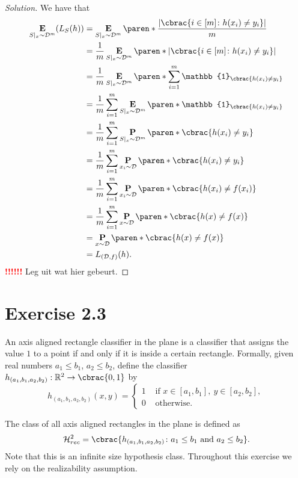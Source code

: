 \documentclass[10pt, a4paper, twoside]{amsart}
\newcommand{\R}{\ensuremath{\mathbb{R}}}
\DeclarePairedDelimiter\abs{\lvert}{\rvert}
\DeclarePairedDelimiter\cbrac\{\}
\DeclarePairedDelimiter\paren()
\renewcommand{\c}{\ensuremath{\colon}}
\newcommand{\Ind}{\ensuremath{\mathbb{1}}}
\renewcommand{\P}{\operatorname*{\ensuremath{\mathbf{P}}}}
\newcommand{\Ev}{\operatorname*{\ensuremath{\mathbf{E}}}}
\newenvironment{solution}
               {\let\oldqedsymbol=\qedsymbol
                \renewcommand{\qedsymbol}{$\blacktriangleleft$}
                \begin{proof}[Solution]}
               {\end{proof}
                \renewcommand{\qedsymbol}{\oldqedsymbol}}
\newcommand{\TODO}{\textcolor{red}{\textbf{!!!!!! }}}
\begin{document}
\begin{solution}
We have that
\begin{align*}
 \Ev\limits_{S|_x \sim \mathcal{D}^m}(L_{S}(h)) 
 &=\Ev\limits_{S|_x \sim \mathcal{D}^m}\paren*{\frac{\abs{\cbrac{i\in [m] \c h(x_i) \neq y_i}}}{m}} \\
 &=\frac{1}{m}\Ev\limits_{S|_x \sim \mathcal{D}^m}\paren*{\abs{\cbrac{i\in [m] \c h(x_i) \neq y_i}}} \\
 &=\frac{1}{m}\Ev\limits_{S|_x \sim \mathcal{D}^m}\paren*{\sum_{i=1}^m \Ind_{\cbrac{h(x_i)\neq y_i}}} \\
 &=\frac{1}{m}\sum_{i=1}^m \Ev\limits_{S|_x \sim \mathcal{D}^m}\paren*{\Ind_{\cbrac{h(x_i)\neq y_i}}} \\
 &=\frac{1}{m}\sum_{i=1}^m \P\limits_{S|_x \sim \mathcal{D}^m}\paren*{\cbrac{h(x_i)\neq y_i}} \\
 &=\frac{1}{m}\sum_{i=1}^m \P\limits_{x_i \sim \mathcal{D}}\paren*{\cbrac{h(x_i)\neq y_i}} \\
 &=\frac{1}{m}\sum_{i=1}^m \P\limits_{x_i \sim \mathcal{D}}\paren*{\cbrac{h(x_i)\neq f(x_i)}} \\
 &=\frac{1}{m}\sum_{i=1}^m \P\limits_{x \sim \mathcal{D}}\paren*{\cbrac{h(x)\neq f(x)}} \\
 &=\P\limits_{x \sim \mathcal{D}}\paren*{\cbrac{h(x)\neq f(x)}} \\
 &=L_{(\mathcal{D},f)}(h).
\end{align*}
\TODO Leg uit wat hier gebeurt.


\end{solution}


\section*{Exercise 2.3}
An axis aligned rectangle classifier in the plane is a classifier that assigns the value $1$ to a point 
if and only if it is inside a certain rectangle. 
Formally, given real numbers $a_1 \leq b_1$, $a_2 \leq b_2$, define the classifier $h_{(a_1, b_1, a_2, b_2)}:\R^2\to\cbrac{0,1}$ by
\begin{equation*}
h_{(a_1, b_1, a_2, b_2)}(x, y)=
\begin{cases}
 1 & \text{ if }x \in [a_1, b_1], \ y \in [a_2, b_2], \\
 0 & \text{ otherwise}.
\end{cases}
\end{equation*}

The class of all axis aligned rectangles in the plane is defined as
\begin{equation*}
\mathcal{H}^2_{rec}=\cbrac{h_{(a_1, b_1, a_2, b_2)} \c a_1 \leq b_1 \text{ and } a_2 \leq b_2}.
\end{equation*}
Note that this is an infinite size hypothesis class. Throughout this exercise we rely on the realizability assumption.
\end{document}
